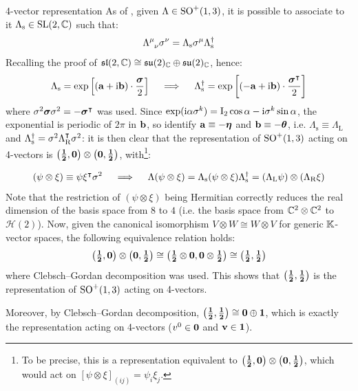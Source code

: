 \begin{observation}{4-vector representation}{}
As of , given $ \Lambda \in \mathrm{SO}^+(1,3) $, it is possible to associate to it $ \Lambda_\text{s} \in \mathrm{SL}(2,\mathbb{C}) $ such that:
\begin{equation}
  \tensor{\Lambda}{^\mu_\nu} \sigma^\nu = \Lambda_\text{s} \sigma^\mu \Lambda_\text{s}\dg
\end{equation}
Recalling the proof of  $ \mathfrak{sl}(2,\mathbb{C}) \cong \mathfrak{su}(2)_{\mathbb{C}} \oplus \mathfrak{su}(2)_{\mathbb{C}} $, hence:
\begin{equation*}
  \Lambda_\text{s} = \exp \left[ \left( \mathbf{a} + \mathrm{i} \mathbf{b} \right) \cdot \frac{\boldsymbol{\sigma}}{2} \right]
  \quad \implies \quad
  \Lambda_\text{s}^\dagger = \exp \left[ \left( - \mathbf{a} + \mathrm{i} \mathbf{b} \right) \cdot \frac{\boldsymbol{\sigma}^\intercal}{2} \right]
\end{equation*}
where $ \sigma^2 \boldsymbol{\sigma} \sigma^2 = - \boldsymbol{\sigma}^\intercal $ was used. Since $ \exp(\mathrm{i} \alpha \sigma^k) = \mathrm{I}_2 \cos \alpha - \mathrm{i} \sigma^k \sin \alpha $, the exponential is periodic of $ 2\pi $ in $ \mathbf{b} $, so identify $ \mathbf{a} \equiv - \boldsymbol{\eta} $ and $ \mathbf{b} \equiv - \boldsymbol{\theta} $, i.e. $ \Lambda_\text{s} \equiv \Lambda_\text{L} $ and $ \Lambda_\text{s}^\dagger = \sigma^2 \Lambda_\text{R}^\intercal \sigma^2 $: it is then clear that the representation of $ \mathrm{SO}^+(1,3) $ acting on 4-vectors is $ \mathbf{\left( \frac{1}{2},0 \right)} \otimes \mathbf{ \left( 0,\frac{1}{2} \right)} $, with\footnote{To be precise, this is a representation equivalent to $ \mathbf{\left( \frac{1}{2},0 \right)} \otimes \mathbf{\left( 0,\frac{1}{2} \right)} $, which would act on $ [\psi \otimes \xi]_{(ij)} = \psi_i \xi_j $.}:

\begin{equation*}
  (\psi \otimes \xi) \equiv \psi \xi^\intercal \sigma^2
  \quad \implies \quad
  \Lambda (\psi \otimes \xi) = \Lambda_\text{s} (\psi \otimes \xi) \Lambda_\text{s}^\dagger = (\Lambda_\text{L} \psi) \otimes (\Lambda_\text{R} \xi)
\end{equation*}
Note that the restriction of $ (\psi \otimes \xi) $ being Hermitian correctly reduces the real dimension of the basis space from $ 8 $ to $ 4 $ (i.e. the basis space from $ \mathbb{C}^2 \otimes \mathbb{C}^2 $ to $ \mathcal{H}(2) $). Now, given the canonical isomorphism $ V \otimes W \cong W \otimes V $ for generic $ \mathbb{K} $-vector spaces, the following equivalence relation holds\footnotemark:
\begin{equation*}
  \mathbf{\left( \tfrac{1}{2},0 \right)} \otimes \mathbf{\left( 0,\tfrac{1}{2} \right)}
  \cong
  \mathbf{\left( \tfrac{1}{2} \otimes 0 , 0 \otimes \tfrac{1}{2} \right)}
  \cong
  \mathbf{\left( \tfrac{1}{2} , \tfrac{1}{2} \right)}
\end{equation*}
where Clebsch--Gordan decomposition was used. This shows that $ \mathbf{\left( \frac{1}{2},\frac{1}{2} \right)} $ is the representation of $ \mathrm{SO}^+(1,3) $ acting on 4-vectors.

Moreover, by Clebsch--Gordan decomposition, $ \mathbf{\left( \frac{1}{2},\frac{1}{2} \right)} \cong \mathbf{0} \oplus \mathbf{1} $, which is exactly the representation acting on 4-vectors ($ v^0 \in \mathbf{0} $ and $ \mathbf{v} \in \mathbf{1} $).
\end{observation}

